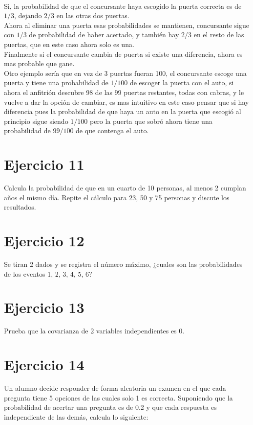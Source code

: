 \documentclass[12pt]{article}
\begin{document}
\paragraph{} Si, la probabilidad de que el concursante haya escogido la puerta correcta es de $1/3$, dejando $2/3$ en las otras dos puertas.\\ Ahora al eliminar una puerta esas probabilidades se mantienen, concursante sigue con $1/3$ de probabilidad de haber acertado, y también hay $2/3$ en el resto de las puertas, que en este caso ahora solo es una.\\
Finalmente si el concursante cambia de puerta si existe una diferencia, ahora es mas probable que gane.\\
Otro ejemplo sería que en vez de 3 puertas fueran 100, el concursante escoge una puerta y tiene una probabilidad de $1/100$ de escoger la puerta con el auto, si ahora el anfitrión descubre 98 de las 99 puertas restantes, todas con cabras, y le vuelve a dar la opción de cambiar, es mas intuitivo en este caso pensar que si hay diferencia pues la probabilidad de que haya un auto en la puerta que escogió al principio sigue siendo $1/100$ pero la puerta que sobró ahora tiene una probabilidad de $99/100$ de que contenga el auto.
\section{Ejercicio 11}
Calcula la probabilidad de que en un cuarto de 10 personas, al menos 2 cumplan años el
mismo día. Repite el cálculo para 23, 50 y 75 personas y discute los resultados.
\section{Ejercicio 12}
Se tiran 2 dados y se registra el número máximo, ¿cuales son las probabilidades de los eventos
1, 2, 3, 4, 5, 6?
\section{Ejercicio 13}
 Prueba que la covarianza de 2 variables independientes es 0.
\section{Ejercicio 14}
 Un alumno decide responder de forma aleatoria un examen en el que cada pregunta tiene
5 opciones de las cuales solo 1 es correcta. Suponiendo que la probabilidad de acertar una
pregunta es de 0.2 y que cada respuesta es independiente de las demás, calcula lo siguiente:\\
\end{document}
